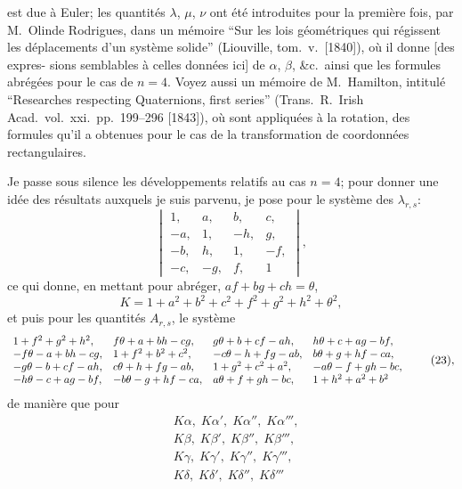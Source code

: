 \documentclass[11pt]{article}
\begin{document}
est due \`a Euler; les quantit\'es $\lambda$, $\mu$, $\nu$ ont \'et\'e introduites pour la premi\`ere fois, par
M.~Olinde Rodrigues, dans un m\'emoire ``Sur les lois g\'eom\'etriques qui r\'egissent les
d\'eplacements d'un syst\`eme solide'' (Liouville, tom.~v.\ [1840]), o\`u il donne [des expres-
sions semblables \`a celles donn\'ees ici] de $\alpha$, $\beta$, \&c.\ ainsi que les formules abr\'eg\'ees pour
le cas de $n = 4$. Voyez aussi un m\'emoire de M.~Hamilton, intitul\'e ``Researches respecting
Quaternions, first series'' (Trans.~R.~Irish Acad.~vol.~xxi.\ pp.~199--296 [1843]), o\`u sont
appliqu\'ees \`a la rotation, des formules qu'il a obtenues pour le cas de la transformation
de coordonn\'ees rectangulaires.

\medskip
Je passe sous silence les d\'eveloppements relatifs au cas $n = 4$; pour donner une id\'ee des r\'esultats auxquels je suis parvenu, je pose pour le syst\`eme des $\lambda_{r,s}$:
\[
\begin{vmatrix} 1, & a, & b, & c, \\ -a, & 1, & -h, & g, \\ -b, & h, & 1, & -f, \\ -c, & -g, & f, & 1 \end{vmatrix} \tag{21},
\]
ce qui donne, en mettant pour abr\'eger, $a f + b g + c h = \theta$,
\[
K = 1 + a^{2} + b^{2} + c^{2} + f^{2} + g^{2} + h^{2} + \theta^{2} \tag{22},
\]
et puis pour les quantit\'es $A_{r,s}$, le syst\`eme
\[
\resizebox{\textwidth}{!}{$\displaystyle
\begin{array}{llll}
1 + f^{2} + g^{2} + h^{2}, & f\theta + a + b h - c g, & g\theta + b + c f - a h, & h\theta + c + a g - b f, \\
-f\theta - a + b h - c g, & 1 + f^{2} + b^{2} + c^{2}, & -c\theta - h + f g - a b, & b\theta + g + h f - c a, \\
-g\theta - b + c f - a h, & c\theta + h + f g - a b, & 1 + g^{2} + c^{2} + a^{2}, & -a\theta - f + g h - b c, \\
-h\theta - c + a g - b f, & -b\theta - g + h f - c a, & a\theta + f + g h - b c, & 1 + h^{2} + a^{2} + b^{2}
\end{array}$} \tag{23},
\]
de mani\`ere que pour
\[
\begin{aligned}
& K\alpha, \; K\alpha', \; K\alpha'', \; K\alpha''', \\
& K\beta, \; K\beta', \; K\beta'', \; K\beta''', \\
& K\gamma, \; K\gamma', \; K\gamma'', \; K\gamma''', \\
& K\delta, \; K\delta', \; K\delta'', \; K\delta'''
\end{aligned}
\tag{24}
\]
\end{document}
